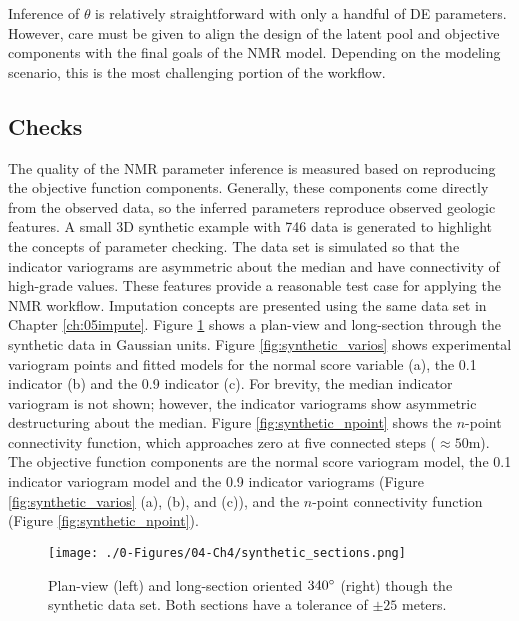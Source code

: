 Inference of $\theta$ is relatively straightforward with only a handful of \gls{DE} parameters. However, care must be given to align the design of the latent pool and objective components with the final goals of the \gls{NMR} model. Depending on the modeling scenario, this is the most challenging portion of the workflow.

\FloatBarrier
\subsection{Checks}
\label{subsec:04checks}

The quality of the \gls{NMR} parameter inference is measured based on reproducing the objective function components. Generally, these components come directly from the observed data, so the inferred parameters reproduce observed geologic features. A small \gls{3D} synthetic example with 746 data is generated to highlight the concepts of parameter checking. The data set is simulated so that the indicator variograms are asymmetric about the median and have connectivity of high-grade values. These features provide a reasonable test case for applying the \gls{NMR} workflow. Imputation concepts are presented using the same data set in Chapter \ref{ch:05impute}. Figure \ref{fig:synthetic_sections} shows a plan-view and long-section through the synthetic data in Gaussian units. Figure \ref{fig:synthetic_varios} shows experimental variogram points and fitted models for the normal score variable (a), the 0.1 indicator (b) and the 0.9 indicator (c). For brevity, the median indicator variogram is not shown; however, the indicator variograms show asymmetric destructuring about the median. Figure \ref{fig:synthetic_npoint} shows the $n$-point connectivity function, which approaches zero at five connected steps ($\approx 50$m). The objective function components are the normal score variogram model, the 0.1 indicator variogram model and the 0.9 indicator variograms (Figure \ref{fig:synthetic_varios} (a), (b), and (c)), and the $n$-point connectivity function (Figure \ref{fig:synthetic_npoint}).

\begin{figure}[htb!]
    \centering
    \texttt{[image: ./0-Figures/04-Ch4/synthetic\_sections.png]}
    \caption{Plan-view (left) and long-section oriented $340\degree$ (right) though the synthetic data set. Both sections have a tolerance of $\pm25$ meters.}
    \label{fig:synthetic_sections}
\end{figure}

